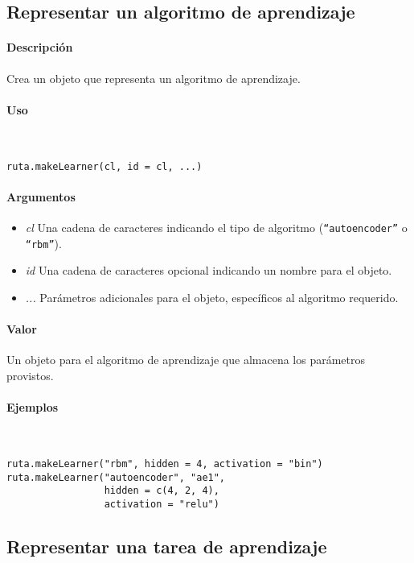 \subsection{Representar un algoritmo de aprendizaje}

\paragraph{Descripción}
Crea un objeto que representa un algoritmo de aprendizaje.

\paragraph{Uso}
~

\begin{lstlisting}
ruta.makeLearner(cl, id = cl, ...)
\end{lstlisting}

\paragraph{Argumentos}
\begin{itemize}
\item \emph{cl}	Una cadena de caracteres indicando el tipo de algoritmo (\texttt{``autoencoder''} o \texttt{``rbm''}).
\item \emph{id}	Una cadena de caracteres opcional indicando un nombre para el objeto.
  \item \emph{...} Parámetros adicionales para el objeto, específicos al algoritmo requerido.
\end{itemize}

\paragraph{Valor}
Un objeto para el algoritmo de aprendizaje que almacena los parámetros provistos.

\paragraph{Ejemplos}
~

\begin{lstlisting}
ruta.makeLearner("rbm", hidden = 4, activation = "bin")
ruta.makeLearner("autoencoder", "ae1",
                 hidden = c(4, 2, 4),
                 activation = "relu")
               \end{lstlisting}


\subsection{Representar una tarea de aprendizaje}

